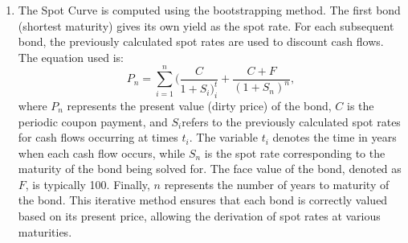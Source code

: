 \documentclass{article}
\begin{document}
\begin{enumerate}
\begin{enumerate}
        \item The Spot Curve is computed using the bootstrapping method. The first bond (shortest maturity) gives its own yield as the spot rate. For each subsequent bond, the previously calculated spot rates are used to discount cash flows. The equation used is: 
        $$P_n = \sum^n_{i = 1}(\frac{C}{1 + S_i)^t_i} + \frac{C + F}{(1 + S_n)^n}, $$
        where $P_n$ represents the present value (dirty price) of the bond, $C$ is the periodic coupon payment, and $S_i$refers to the previously calculated spot rates for cash flows occurring at times $t_i$. The variable $t_i$ denotes the time in years when each cash flow occurs, while $S_n$ is the spot rate corresponding to the maturity of the bond being solved for. The face value of the bond, denoted as $F$, is typically 100. Finally, $n$ represents the number of years to maturity of the bond. This iterative method ensures that each bond is correctly valued based on its present price, allowing the derivation of spot rates at various maturities.


\end{enumerate}
\end{enumerate}
\end{document}
